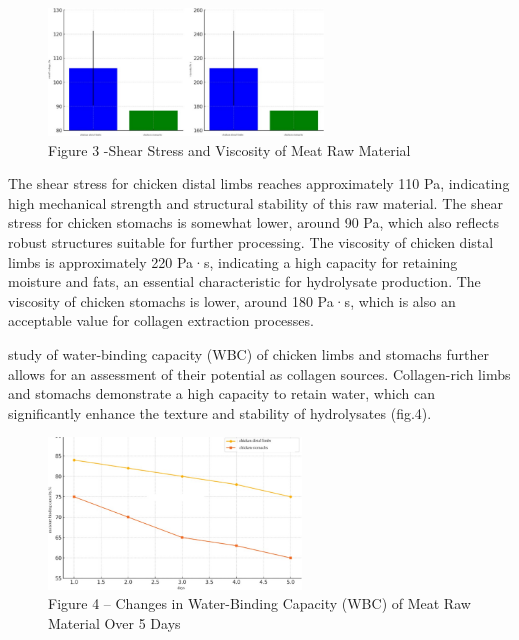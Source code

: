 \begin{figure}[H]
	\centering
	\includegraphics[width=0.65\textwidth]{media/pish/image11}
	\caption*{Figure 3 -Shear Stress and Viscosity of Meat Raw Material}
\end{figure}

\begin{multicols}{2}
The shear stress for chicken distal limbs reaches approximately 110 Pa,
indicating high mechanical strength and structural stability of this raw
material. The shear stress for chicken stomachs is somewhat lower,
around 90 Pa, which also reflects robust structures suitable for further
processing. The viscosity of chicken distal limbs is approximately 220
Pa·s, indicating a high capacity for retaining moisture and fats, an
essential characteristic for hydrolysate production. The viscosity of
chicken stomachs is lower, around 180 Pa·s, which is also an acceptable
value for collagen extraction processes.

study of water-binding capacity (WBC) of chicken limbs and stomachs
further allows for an assessment of their potential as collagen sources.
Collagen-rich limbs and stomachs demonstrate a high capacity to retain
water, which can significantly enhance the texture and stability of
hydrolysates (fig.4).
\end{multicols}

\begin{figure}[H]
	\centering
	\includegraphics[width=0.6\textwidth]{media/pish/image12}
	\caption*{Figure 4 -- Changes in Water-Binding Capacity (WBC) of Meat Raw
Material Over 5 Days}
\end{figure}


